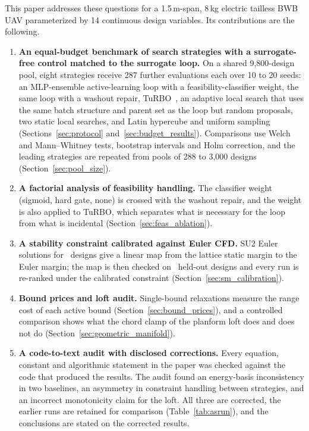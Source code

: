 This paper addresses these questions for a 1.5\,m-span, 8\,kg electric tailless BWB UAV parameterized by 14 continuous design variables. Its contributions are the following.
\begin{enumerate}
    \item \textbf{An equal-budget benchmark of search strategies with a surrogate-free control matched to the surrogate loop.} On a shared 9,800-design pool, eight strategies receive 287 further evaluations each over 10 to 20 seeds: an MLP-ensemble active-learning loop with a feasibility-classifier weight, the same loop with a washout repair, TuRBO~\cite{eriksson2019turbo}, an adaptive local search that uses the same batch structure and parent set as the loop but random proposals, two static local searches, and Latin hypercube and uniform sampling (Sections~\ref{sec:protocol} and~\ref{sec:budget_results}). Comparisons use Welch and Mann--Whitney tests, bootstrap intervals and Holm correction, and the leading strategies are repeated from pools of 288 to 3{,}000 designs (Section~\ref{sec:pool_size}).
    \item \textbf{A factorial analysis of feasibility handling.} The classifier weight (sigmoid, hard gate, none) is crossed with the washout repair, and the weight is also applied to TuRBO, which separates what is necessary for the loop from what is incidental (Section~\ref{sec:feas_ablation}).
    \item \textbf{A stability constraint calibrated against Euler CFD.} SU2 Euler solutions for \NcalN\ designs give a linear map from the lattice static margin to the Euler margin; the map is then checked on \NoosN\ held-out designs and every run is re-ranked under the calibrated constraint (Section~\ref{sec:sm_calibration}).
    \item \textbf{Bound prices and loft audit.} Single-bound relaxations measure the range cost of each active bound (Section~\ref{sec:bound_prices}), and a controlled comparison shows what the chord clamp of the planform loft does and does not do (Section~\ref{sec:geometric_manifold}).
    \item \textbf{A code-to-text audit with disclosed corrections.} Every equation, constant and algorithmic statement in the paper was checked against the code that produced the results. The audit found an energy-basis inconsistency in two baselines, an asymmetry in constraint handling between strategies, and an incorrect monotonicity claim for the loft. All three are corrected, the earlier runs are retained for comparison (Table~\ref{tab:asrun}), and the conclusions are stated on the corrected results.
\end{enumerate}

